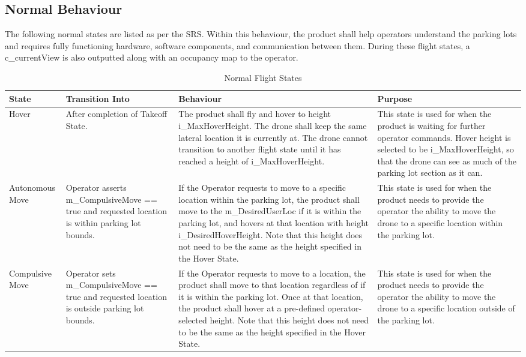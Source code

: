 \documentclass[12pt, titlepage]{article}
\begin{document}
\subsection{Normal Behaviour}
\label{subsec:NormalBeh}

The following normal states are listed as per the SRS. Within this behaviour, the product shall help operators understand the parking lots and requires fully functioning hardware, software components, and communication between them. During these flight states, a c\_currentView is also outputted along with an occupancy map to the operator.

\begin{table}[!h]
\begin{center}
\caption {Normal Flight States}
\label{FlightStates}
\begin{tabular}{ | m{2.1cm} | m{3cm} | m{6cm} | m{4cm} | } 
\hline
 State & Transition Into & Behaviour & Purpose \\ 
 \hline Hover & After completion of Takeoff State. & 
    The product shall fly and hover to height i\_MaxHoverHeight. The drone shall keep the same lateral location it is currently at. The drone cannot transition to another flight state until it has reached a height of i\_MaxHoverHeight. & 
    This state is used for when the product is waiting for further operator commands. Hover height is selected to be i\_MaxHoverHeight, so that the drone can see as much of the parking lot section as it  can. \\
\hline Autonomous Move & Operator asserts m_CompulsiveMove == true and requested      location is within parking lot bounds. & 
    If the Operator requests to move to a specific location within the parking lot, the product shall move to the m\_DesiredUserLoc if it is within the parking lot, and hovers at that location with height i\_DesiredHoverHeight. Note that this height does not need to be the same as the height specified in the Hover State. & 
    This state is used for when the product needs to provide the operator the ability to move the drone to a specific location within the parking lot. \\
\hline Compulsive Move & Operator sets m_CompulsiveMove == true and requested         location is outside parking lot bounds.	& 
    If the Operator requests to move to a location, the product shall move to that location regardless of if it is within the parking lot. Once at that location, the product shall hover at a pre-defined operator-selected height. Note that this height does not need to be the same as the height specified in the Hover State.	&
    This state is used for when the product needs to provide the operator the ability to move the drone to a specific location outside of the parking lot. \\
\hline 
\end{tabular}
\end{center}
\end{table}
\end{document}
